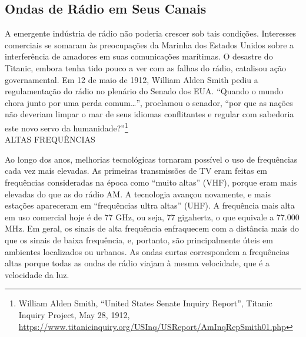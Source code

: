 \documentclass{book}
\begin{document}
\subsection{Ondas de Rádio em Seus Canais}
\label{cap8:os-como-ondas}
A emergente indústria de rádio não poderia crescer sob tais condições. Interesses
comerciais se somaram às preocupações da Marinha dos Estados Unidos sobre a
interferência de amadores em suas comunicações marítimas. O desastre do Titanic,
embora tenha tido pouco a ver com as falhas do rádio, catalisou ação governamental.
Em 12 de maio de 1912, William Alden Smith pediu a regulamentação do rádio no
plenário do Senado dos EUA. ``Quando o mundo chora junto por uma perda comum\ldots'',
proclamou o senador, ``por que as nações não deveriam limpar o mar de seus idiomas
conflitantes e regular com sabedoria este novo servo da humanidade?''\footnote{
William Alden Smith, ``United States Senate Inquiry Report'', Titanic Inquiry
Project, May 28, 1912, \url{https://www.titanicinquiry.org/USInq/USReport/AmInqRepSmith01.php}}\\

ALTAS FREQUÊNCIAS

Ao longo dos anos, melhorias tecnológicas tornaram possível o uso de frequências
cada vez mais elevadas. As primeiras transmissões de TV eram feitas em frequências
consideradas na época como ``muito altas'' (VHF), porque eram mais elevadas do
que as do rádio AM. A tecnologia avançou novamente, e mais estações apareceram
em ``frequências ultra altas'' (UHF). A frequência mais alta em uso comercial hoje
é de 77 GHz, ou seja, 77 gigahertz, o que equivale a 77.000 MHz. Em geral, os
sinais de alta frequência enfraquecem com a distância mais do que os sinais de
baixa frequência, e, portanto, são principalmente úteis em ambientes localizados
ou urbanos. As ondas curtas correspondem a frequências altas porque todas as ondas
de rádio viajam à mesma velocidade, que é a velocidade da luz.\\
\end{document}
